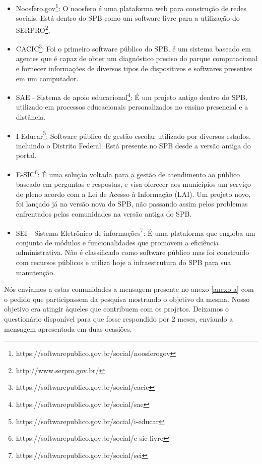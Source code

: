 \begin{itemize}

\item Noosfero.gov\footnote{https://softwarepublico.gov.br/social/noosferogov}: 
O noosfero é uma plataforma web para construção de redes sociais. Está dentro do
SPB como um software livre para a utilização do SERPRO\footnote{http://www.serpro.gov.br/}, 

\item CACIC\footnote{https://softwarepublico.gov.br/social/cacic}: Foi o primeiro 
software público do SPB, é um sistema baseado em agentes que é capaz de obter um 
diagnóstico preciso do parque computacional e fornecer informações de diversos tipos 
de dispositivos e softwares presentes em um computador.

\item SAE - Sistema de apoio educacional\footnote{https://softwarepublico.gov.br/social/sae}:
É um projeto antigo dentro do SPB, utilizado em processos educacionais personalizados no 
ensino presencial e a distância.  

\item I-Educar\footnote{https://softwarepublico.gov.br/social/i-educar}: Software público de 
gestão escolar utilizado por diversos estados, incluindo o Distrito Federal. Está presente
no SPB desde a versão antiga do portal.

\item E-SIC\footnote{https://softwarepublico.gov.br/social/e-sic-livre}: É uma solução voltada 
para a gestão de atendimento ao público baseado em perguntas e respostas, e visa 
oferecer aos municípios um serviço de pleno acordo com a Lei de Acesso à Informação (LAI).
Um projeto novo, foi lançado já na versão nova do SPB, não passando assim pelos 
problemas enfrentados pelas comunidades na versão antiga do SPB.

\item SEI - Sistema Eletrônico de informações\footnote{https://softwarepublico.gov.br/social/sei}:
É uma plataforma que engloba um conjunto de módulos e funcionalidades que promovem 
a eficiência administrativa. Não é classificado como software público mas foi construído com
recursos públicos e utiliza hoje a infraestrutura do SPB para sua manutenção.

\end{itemize}


Nós enviamos a estas comunidades a mensagem presente no anexo \ref{anexo a}
com o pedido que participassem da pesquisa mostrando o objetivo da mesma. Nosso objetivo 
era atingir àqueles que contribuem com os projetos. Deixamos o questionário disponível 
para que fosse respondido por 2 meses, enviando a mensagem apresentada em duas ocasiões.

